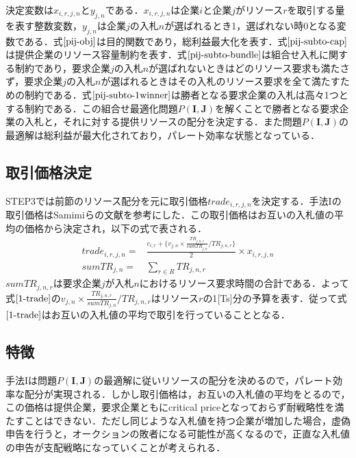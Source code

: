 決定変数は\(x_{i,r,j,n}\)と\(y_{j,n}\)である．\(x_{i,r,j,n}\)は企業\(i\)と企業\(j\)がリソース\(r\)を取引する量を表す整数変数，\(y_{j,n}\)は企業\(j\)の入札\(n\)が選ばれるとき1，選ばれない時0となる変数である．式\(\eqref{pij-obj}\)は目的関数であり，総利益最大化を表す．式\(\eqref{pij-subto-cap}\)は提供企業のリソース容量制約を表す．式\(\eqref{pij-subto-bundle}\)は組合せ入札に関する制約であり，要求企業\(j\)の入札\(n\)が選ばれないときはどのリソース要求も満たさず，要求企業\(j\)の入札\(n\)が選ばれるときはその入札のリソース要求を全て満たすための制約である．式\(\eqref{pij-subto-1winner}\)は勝者となる要求企業の入札は高々1つとする制約である．この組合せ最適化問題\(P(\boldsymbol{I},\boldsymbol{J})\)を解くことで勝者となる要求企業の入札と，それに対する提供リソースの配分を決定する．また問題\(P(\boldsymbol{I},\boldsymbol{J})\)の最適解は総利益が最大化されており，パレート効率な状態となっている．

\hypertarget{ux53d6ux5f15ux4fa1ux683cux6c7aux5b9a}{%
\subsection{取引価格決定}\label{ux53d6ux5f15ux4fa1ux683cux6c7aux5b9a}}

STEP3では前節のリソース配分を元に取引価格\(trade_{i,r,j,n}\)を決定する．手法Iの取引価格はSamimiらの文献を参考にした\cite{Samimi2016}．この取引価格はお互いの入札値の平均の価格から決定され，以下の式で表される．
\begin{align}
trade_{i,r,j,n}=&\frac{c_{i,r}+\{v_{j,n}×\frac{TR_{j,n,r}}{sumTR_{j,n}}/TR_{j,n,r}\}}{2}\times x_{i,r,j,n} \label{1-trade}\\
sumTR_{j,n} = &\sum_{r  \in R} TR_{j,n,r} \label{sumtime}
\end{align}
\(sumTR_{j,n,r}\)は要求企業\(j\)が入札\(n\)におけるリソース要求時間の合計である．よって式\(\eqref{1-trade}\)の\(v_{j,n}×\frac{TR_{j,n,r}}{sumTR_{j,n}}/TR_{j,n,r}\)はリソース\(r\)の1{[}Ts{]}分の予算を表す．従って式\(\eqref{1-trade}\)はお互いの入札値の平均で取引を行っていることとなる．

\hypertarget{ux7279ux5fb4}{%
\subsection{特徴}\label{ux7279ux5fb4}}

手法Iは問題\(P(\boldsymbol{I},\boldsymbol{J})\)の最適解に従いリソースの配分を決めるので，パレート効率な配分が実現される．しかし取引価格は，お互いの入札値の平均をとるので，この価格は提供企業，要求企業ともにcritical
priceとなっておらず耐戦略性を満たすことはできない．ただし同じような入札値を持つ企業が増加した場合，虚偽申告を行うと，オークションの敗者になる可能性が高くなるので，正直な入札値の申告が支配戦略になっていくことが考えられる．

